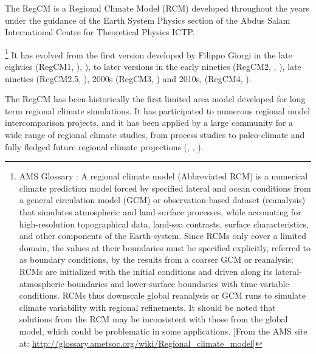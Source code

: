 
The \ac{RegCM} is a Regional Climate Model (RCM) developed throughout the
years under the guidance of the Earth System Physics section of
the Abdus Salam International Centre for Theoretical Physics \ac{ICTP}.

\footnote{AMS Glossary : A regional climate model (Abbreviated RCM) is a
numerical climate prediction model forced by specified lateral and ocean
conditions from a general circulation model (GCM) or observation-based
dataset (reanalysis) that simulates atmospheric and land surface processes,
while accounting for high-resolution topographical data, land-sea contrasts,
surface characteristics, and other components of the Earth-system.
Since RCMs only cover a limited domain, the values at their boundaries
must be specified explicitly, referred to as boundary conditions, by the
results from a coarser GCM or reanalysis; RCMs are initialized with the
initial conditions and driven along its lateral-atmospheric-boundaries and
lower-surface boundaries with time-variable conditions.
RCMs thus downscale global reanalysis or GCM runs to simulate climate
variability with regional refinements. It should be noted that solutions
from the RCM may be inconsistent with those from the global model, which
could be problematic in some applications. [From the AMS site at:
\url{http://glossary.ametsoc.org/wiki/Regional_climate_model}]}
It has evolved from the first version developed by Filippo Giorgi in the
late eighties (\ac{RegCM}1, \cite{Dickinson_89}), \cite{Giorgi_90}), to later
versions in the early nineties (\ac{RegCM}2, \cite{Giorgi_93b},
\cite{Giorgi_93c}), late nineties (\ac{RegCM}2.5, \cite{Giorgi_99}),
2000s (\ac{RegCM}3, \cite{Pal_00}) and 2010s,
(\ac{RegCM}4, \cite{Giorgi_13}).

The \ac{RegCM} has been historically the first limited area model
developed for long term regional climate simulations. It has participated to
numerous regional model intercomparison projects, and it has been applied by
a large community for a wide range of regional climate studies, from process
studies to paleo-climate and fully fledged future regional climate
projections (\cite{Giorgi_99}, \cite{Giorgi_06}, \cite{Giorgi_14}).

